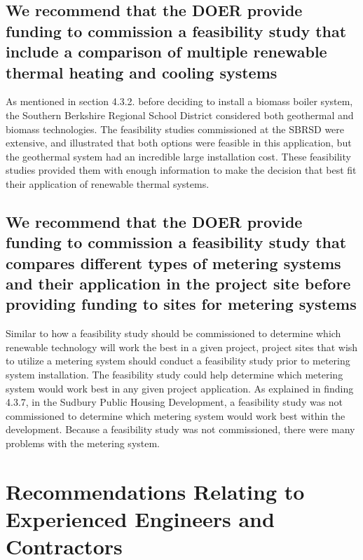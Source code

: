 \subsection{We recommend that the DOER provide funding to commission a feasibility study that include a comparison of multiple renewable thermal heating and cooling systems}
\par As mentioned in section 4.3.2. before deciding to install a biomass boiler system, the Southern Berkshire Regional School District considered both geothermal and biomass technologies. The feasibility studies commissioned at the SBRSD were extensive, and illustrated that both options were feasible in this application, but the geothermal system had an incredible large installation cost. These feasibility studies provided them with enough information to make the decision that best fit their application of renewable thermal systems. 

\subsection{We recommend that the DOER provide funding to commission a feasibility study that compares different types of metering systems and their application in the project site before providing funding to sites for metering systems}
\par Similar to how a feasibility study should be commissioned to determine which renewable technology will work the best in a given project, project sites that wish to utilize a metering system should conduct a feasibility study prior to metering system installation. The feasibility study could help determine which metering system would work best in any given project application. As explained in finding 4.3.7, in the Sudbury Public Housing Development, a feasibility study was not commissioned to determine which metering system would work best within the development. Because a feasibility study was not commissioned, there were many problems with the metering system. 

\section{Recommendations Relating to Experienced Engineers and Contractors}
